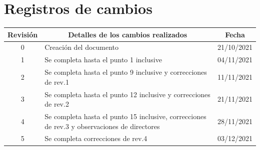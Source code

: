 \documentclass[
11pt, %
codirector, %
]{charter}
\begin{document}
\maketitle
\thispagestyle{empty}
\pagebreak


\thispagestyle{empty}
{\setlength{\parskip}{0pt}
\tableofcontents{}
}
\pagebreak


\section*{Registros de cambios}
\label{sec:registro}


\begin{table}[ht]
\label{tab:registro}
\centering
\begin{tabularx}{\linewidth}{@{}|c|X|c|@{}}
\hline
\rowcolor[HTML]{C0C0C0} 
Revisión & \multicolumn{1}{c|}{\cellcolor[HTML]{C0C0C0}Detalles de los cambios realizados} & Fecha      \\ \hline
0      & Creación del documento                                 & 21/10/2021 \\ \hline %
1      & Se completa hasta el punto 1 inclusive                 & 04/11/2021 \\ \hline
2      & Se completa hasta el punto 9 inclusive y correcciones de rev.1	& 11/11/2021 \\ \hline
3      & Se completa hasta el punto 12 inclusive y correcciones de rev.2	& 21/11/2021 \\ \hline
4      & Se completa hasta el punto 15 inclusive, correcciones de rev.3 y observaciones de directores	& 28/11/2021 \\ \hline
5      & Se completa correcciones de rev.4 	& 03/12/2021 \\ \hline
\end{tabularx}
\end{table}

\pagebreak
\end{document}

